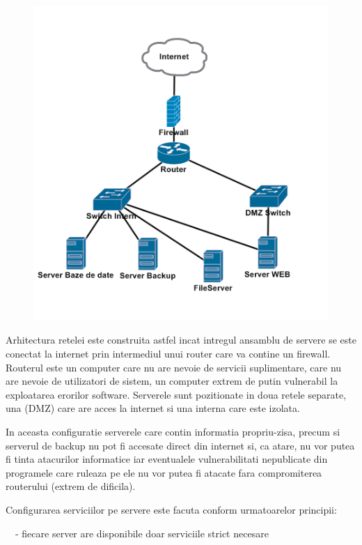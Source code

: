 \begin{figure}[hbt]
\centering
\includegraphics{SecuritateaarhiveiRODA-img002.png}
\label{fig:img002}
\end{figure}

Arhitectura retelei este construita astfel incat intregul ansamblu de servere se este conectat la internet prin
intermediul unui router care va contine un firewall. Routerul este un computer care nu are nevoie de servicii
suplimentare, care nu are nevoie de utilizatori de sistem, un computer extrem de putin vulnerabil la exploatarea
erorilor software. Serverele sunt pozitionate in doua retele separate, una (DMZ) care are acces la internet si una
interna care este izolata.

In aceasta configuratie serverele care contin informatia propriu-zisa, precum si serverul de backup nu pot fi accesate
direct din internet si, ca atare, nu vor putea fi tinta atacurilor informatice iar eventualele vulnerabilitati
nepublicate din programele care ruleaza pe ele nu vor putea fi atacate fara compromiterea routerului (extrem de
dificila).

Configurarea serviciilor pe servere este facuta conform urmatoarelor principii:

{\sffamily\color{black}
\ \ {}- fiecare server are disponibile doar serviciile strict necesare}

